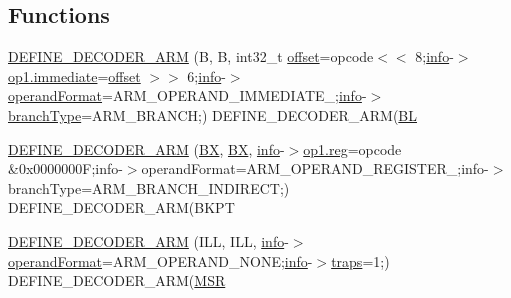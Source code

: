 \subsection*{Functions}
\begin{DoxyCompactItemize}
\item 
\mbox{\hyperlink{decoder-arm_8c_ac0da2d3d96bbeb41dd6258af5f447541}{D\+E\+F\+I\+N\+E\+\_\+\+D\+E\+C\+O\+D\+E\+R\+\_\+\+A\+RM}} (B, B, int32\+\_\+t \mbox{\hyperlink{ioapi_8h_a601c4660e8a1a14a1b87fe387e934d19}{offset}}=opcode$<$$<$ 8;\mbox{\hyperlink{libretro_8h_a283ad41e4809f9c0ebe736a9861d8a91}{info}}-\/$>$\mbox{\hyperlink{lr35902_2decoder_8c_a8bc2501cb64b3bc9ac59754cfafb68d1}{op1.\+immediate}}=\mbox{\hyperlink{ioapi_8h_a601c4660e8a1a14a1b87fe387e934d19}{offset}} $>$$>$ 6;\mbox{\hyperlink{libretro_8h_a283ad41e4809f9c0ebe736a9861d8a91}{info}}-\/$>$\mbox{\hyperlink{decoder-thumb_8c_a52313e50f86644324806d9228ecd8472}{operand\+Format}}=A\+R\+M\+\_\+\+O\+P\+E\+R\+A\+N\+D\+\_\+\+I\+M\+M\+E\+D\+I\+A\+T\+E\+\_;\mbox{\hyperlink{libretro_8h_a283ad41e4809f9c0ebe736a9861d8a91}{info}}-\/$>$\mbox{\hyperlink{decoder-thumb_8c_a8dbbd417010e59d26bfaf79cb6139102}{branch\+Type}}=A\+R\+M\+\_\+\+B\+R\+A\+N\+CH;) D\+E\+F\+I\+N\+E\+\_\+\+D\+E\+C\+O\+D\+E\+R\+\_\+\+A\+RM(\mbox{\hyperlink{decoder-thumb_8c_adafdf5f045e21581219028370836474d}{BL}}
\item 
\mbox{\hyperlink{decoder-arm_8c_a8c9eb8c8a847358483c2f5d1a1b69032}{D\+E\+F\+I\+N\+E\+\_\+\+D\+E\+C\+O\+D\+E\+R\+\_\+\+A\+RM}} (\mbox{\hyperlink{decoder-thumb_8c_aae92ee51d7cebfa199f33594fe133f31}{BX}}, \mbox{\hyperlink{decoder-thumb_8c_aae92ee51d7cebfa199f33594fe133f31}{BX}}, \mbox{\hyperlink{libretro_8h_a283ad41e4809f9c0ebe736a9861d8a91}{info}}-\/$>$\mbox{\hyperlink{lr35902_2decoder_8c_af44c02f7785479603f59b662f3dfae6a}{op1.\+reg}}=opcode \&0x0000000\+F;info-\/$>$operand\+Format=\+A\+R\+M\+\_\+\+O\+P\+E\+R\+A\+N\+D\+\_\+\+R\+E\+G\+I\+S\+T\+E\+R\+\_;info-\/$>$branch\+Type=\+A\+R\+M\+\_\+\+B\+R\+A\+N\+C\+H\+\_\+\+I\+N\+D\+I\+R\+E\+C\+T;) D\+E\+F\+I\+N\+E\+\_\+\+D\+E\+C\+O\+D\+E\+R\+\_\+\+A\+R\+M(\+B\+K\+PT
\item 
\mbox{\hyperlink{decoder-arm_8c_abfe065768263133d1aca71a4b7ac42b3}{D\+E\+F\+I\+N\+E\+\_\+\+D\+E\+C\+O\+D\+E\+R\+\_\+\+A\+RM}} (I\+LL, I\+LL, \mbox{\hyperlink{libretro_8h_a283ad41e4809f9c0ebe736a9861d8a91}{info}}-\/$>$\mbox{\hyperlink{decoder-thumb_8c_a52313e50f86644324806d9228ecd8472}{operand\+Format}}=A\+R\+M\+\_\+\+O\+P\+E\+R\+A\+N\+D\+\_\+\+N\+O\+NE;\mbox{\hyperlink{libretro_8h_a283ad41e4809f9c0ebe736a9861d8a91}{info}}-\/$>$\mbox{\hyperlink{decoder-thumb_8c_afe08430c255629bed908d9bf22397277}{traps}}=1;) D\+E\+F\+I\+N\+E\+\_\+\+D\+E\+C\+O\+D\+E\+R\+\_\+\+A\+RM(\mbox{\hyperlink{decoder-arm_8c_ad9c5d760c45ba502ddfe54752058d02e}{M\+SR}}

\end{DoxyCompactItemize}
